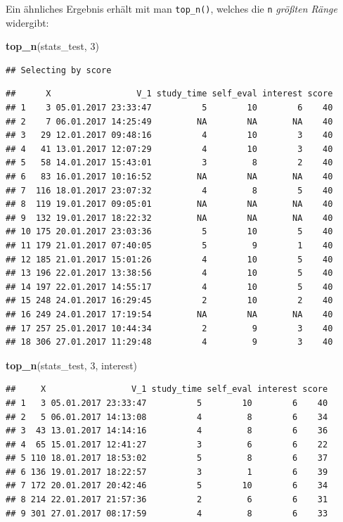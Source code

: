 \documentclass[12pt,ngerman,paper=a4,pagesize,DIV=13]{scrreprt}
\newenvironment{Shaded}{\begin{snugshade}}{\end{snugshade}}
\newcommand{\DecValTok}[1]{\textcolor[rgb]{0.00,0.00,0.81}{#1}}
\newcommand{\KeywordTok}[1]{\textcolor[rgb]{0.13,0.29,0.53}{\textbf{#1}}}
\newcommand{\NormalTok}[1]{#1}
\begin{document}
Ein ähnliches Ergebnis erhält mit man \texttt{top\_n()}, welches die
\texttt{n} \emph{größten Ränge} widergibt:

\begin{Shaded}
\begin{Highlighting}[]
\KeywordTok{top_n}\NormalTok{(stats_test, }\DecValTok{3}\NormalTok{)}
\end{Highlighting}
\end{Shaded}

\begin{verbatim}
## Selecting by score
\end{verbatim}

\begin{verbatim}
##      X                 V_1 study_time self_eval interest score
## 1    3 05.01.2017 23:33:47          5        10        6    40
## 2    7 06.01.2017 14:25:49         NA        NA       NA    40
## 3   29 12.01.2017 09:48:16          4        10        3    40
## 4   41 13.01.2017 12:07:29          4        10        3    40
## 5   58 14.01.2017 15:43:01          3         8        2    40
## 6   83 16.01.2017 10:16:52         NA        NA       NA    40
## 7  116 18.01.2017 23:07:32          4         8        5    40
## 8  119 19.01.2017 09:05:01         NA        NA       NA    40
## 9  132 19.01.2017 18:22:32         NA        NA       NA    40
## 10 175 20.01.2017 23:03:36          5        10        5    40
## 11 179 21.01.2017 07:40:05          5         9        1    40
## 12 185 21.01.2017 15:01:26          4        10        5    40
## 13 196 22.01.2017 13:38:56          4        10        5    40
## 14 197 22.01.2017 14:55:17          4        10        5    40
## 15 248 24.01.2017 16:29:45          2        10        2    40
## 16 249 24.01.2017 17:19:54         NA        NA       NA    40
## 17 257 25.01.2017 10:44:34          2         9        3    40
## 18 306 27.01.2017 11:29:48          4         9        3    40
\end{verbatim}

\begin{Shaded}
\begin{Highlighting}[]
\KeywordTok{top_n}\NormalTok{(stats_test, }\DecValTok{3}\NormalTok{, interest)}
\end{Highlighting}
\end{Shaded}

\begin{verbatim}
##     X                 V_1 study_time self_eval interest score
## 1   3 05.01.2017 23:33:47          5        10        6    40
## 2   5 06.01.2017 14:13:08          4         8        6    34
## 3  43 13.01.2017 14:14:16          4         8        6    36
## 4  65 15.01.2017 12:41:27          3         6        6    22
## 5 110 18.01.2017 18:53:02          5         8        6    37
## 6 136 19.01.2017 18:22:57          3         1        6    39
## 7 172 20.01.2017 20:42:46          5        10        6    34
## 8 214 22.01.2017 21:57:36          2         6        6    31
## 9 301 27.01.2017 08:17:59          4         8        6    33
\end{verbatim}
\end{document}
